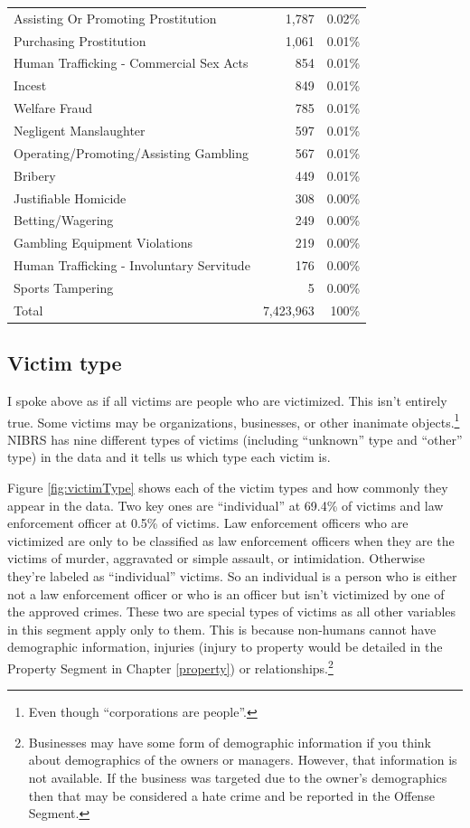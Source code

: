 \documentclass[
  12pt,
  openany]{book}
\begin{document}
\begin{longtable}[]{@{}lrr@{}}
Assisting Or Promoting Prostitution & 1,787 & 0.02\%\tabularnewline
Purchasing Prostitution & 1,061 & 0.01\%\tabularnewline
Human Trafficking - Commercial Sex Acts & 854 & 0.01\%\tabularnewline
Incest & 849 & 0.01\%\tabularnewline
Welfare Fraud & 785 & 0.01\%\tabularnewline
Negligent Manslaughter & 597 & 0.01\%\tabularnewline
Operating/Promoting/Assisting Gambling & 567 & 0.01\%\tabularnewline
Bribery & 449 & 0.01\%\tabularnewline
Justifiable Homicide & 308 & 0.00\%\tabularnewline
Betting/Wagering & 249 & 0.00\%\tabularnewline
Gambling Equipment Violations & 219 & 0.00\%\tabularnewline
Human Trafficking - Involuntary Servitude & 176 & 0.00\%\tabularnewline
Sports Tampering & 5 & 0.00\%\tabularnewline
Total & 7,423,963 & 100\%\tabularnewline
\bottomrule
\end{longtable}

\hypertarget{victim-type}{%
\subsection{Victim type}\label{victim-type}}

I spoke above as if all victims are people who are victimized. This isn't entirely true. Some victims may be organizations, businesses, or other inanimate objects.\footnote{Even though ``corporations are people''.} NIBRS has nine different types of victims (including ``unknown'' type and ``other'' type) in the data and it tells us which type each victim is.

Figure \ref{fig:victimType} shows each of the victim types and how commonly they appear in the data. Two key ones are ``individual'' at 69.4\% of victims and law enforcement officer at 0.5\% of victims. Law enforcement officers who are victimized are only to be classified as law enforcement officers when they are the victims of murder, aggravated or simple assault, or intimidation. Otherwise they're labeled as ``individual'' victims. So an individual is a person who is either not a law enforcement officer or who is an officer but isn't victimized by one of the approved crimes. These two are special types of victims as all other variables in this segment apply only to them. This is because non-humans cannot have demographic information, injuries (injury to property would be detailed in the Property Segment in Chapter \ref{property}) or relationships.\footnote{Businesses may have some form of demographic information if you think about demographics of the owners or managers. However, that information is not available. If the business was targeted due to the owner's demographics then that may be considered a hate crime and be reported in the Offense Segment.}
\end{document}
